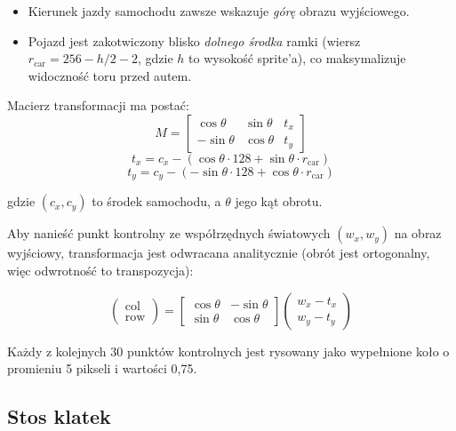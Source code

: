 \documentclass[12pt,a4paper,twocolumn]{article}
\begin{document}
\begin{itemize}
  \item Kierunek jazdy samochodu zawsze wskazuje \emph{górę} obrazu wyjściowego.
  \item Pojazd jest zakotwiczony blisko \emph{dolnego środka} ramki (wiersz $r_\text{car} = 256 - h/2 - 2$, gdzie $h$ to wysokość sprite'a), co maksymalizuje widoczność toru przed autem.
\end{itemize}

Macierz transformacji ma postać:
\begin{equation}
  M =
  \begin{bmatrix}
    \cos\theta & \sin\theta & t_x \\
    -\sin\theta & \cos\theta & t_y
  \end{bmatrix}
\end{equation}
\begin{equation}
  t_x = c_x - (\cos\theta \cdot 128 + \sin\theta \cdot r_\text{car})
\end{equation}
\begin{equation}
  t_y = c_y - (-\sin\theta \cdot 128 + \cos\theta \cdot r_\text{car})
\end{equation}

gdzie $(c_x, c_y)$ to środek samochodu, a $\theta$ jego kąt obrotu.

Aby nanieść punkt kontrolny ze współrzędnych światowych $(w_x, w_y)$ na obraz wyjściowy, transformacja jest odwracana analitycznie (obrót jest ortogonalny, więc odwrotność to transpozycja):

\begin{equation}
  \begin{pmatrix}\text{col}\\\text{row}\end{pmatrix}
  =
  \begin{bmatrix}
    \cos\theta & -\sin\theta \\
    \sin\theta & \cos\theta
  \end{bmatrix}
  \begin{pmatrix} w_x - t_x \\ w_y - t_y \end{pmatrix}
\end{equation}

Każdy z kolejnych 30 punktów kontrolnych jest rysowany jako wypełnione koło o promieniu 5 pikseli i wartości 0,75.

\subsection{Stos klatek}
\end{document}
